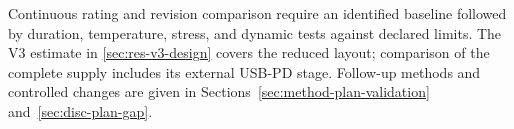 Continuous rating and revision comparison require an identified baseline
followed by duration, temperature, stress, and dynamic tests against declared
limits. The V3 estimate in \cref{sec:res-v3-design} covers the reduced
layout; comparison of the complete supply includes its external USB-PD stage.
Follow-up methods and controlled changes are given
in Sections~\ref{sec:method-plan-validation} and~\ref{sec:disc-plan-gap}.
